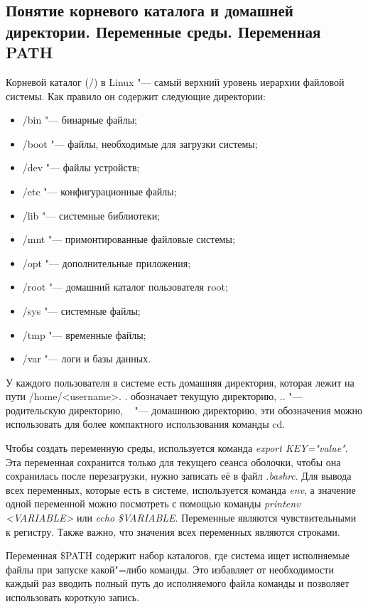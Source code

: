 \documentclass[12pt]{article}
\begin{document}
\subsection{Понятие корневого каталога и домашней директории. Переменные среды. Переменная PATH}
Корневой каталог (/) в Linux "--- самый верхний уровень иерархии файловой системы. Как правило он содержит следующие директории:
\begin{itemize}
\item /bin "--- бинарные файлы;
\item /boot "--- файлы, необходимые для загрузки системы;
\item /dev "--- файлы устройств;
\item /etc "--- конфигурационные файлы;
\item /lib "--- системные библиотеки;
\item /mnt "--- примонтированные файловые системы;
\item /opt "--- дополнительные приложения;
\item /root "--- домашний каталог пользователя root;
\item /sys "--- системные файлы;
\item /tmp "--- временные файлы;
\item /var "--- логи и базы данных.
\end{itemize}

У каждого пользователя в системе есть домашняя директория, которая лежит на пути /home/<username>. . обозначает текущую директорию, .. "--- родительскую директорию, ~ "--- домашнюю директорию, эти обозначения можно использовать для более компактного использования команды cd.

Чтобы создать переменную среды, используется команда \textit{export KEY="value"}. Эта переменная сохранится только для текущего сеанса оболочки, чтобы она сохранилась после перезагрузки, нужно записать её в файл \textit{.bashrc}. Для вывода всех переменных, которые есть в системе, используется команда \textit{env}, а значение одной переменной можно посмотреть с помощью команды \textit{printenv <VARIABLE>} или \textit{echo \$VARIABLE}. Переменные являются чувствительными к регистру. Также важно, что значения всех переменных являются строками.

Переменная \$PATH содержит набор каталогов, где система ищет исполняемые файлы при запуске какой"=либо команды. Это избавляет от необходимости каждый раз вводить полный путь до исполняемого файла команды и позволяет использовать короткую запись.
\end{document}
